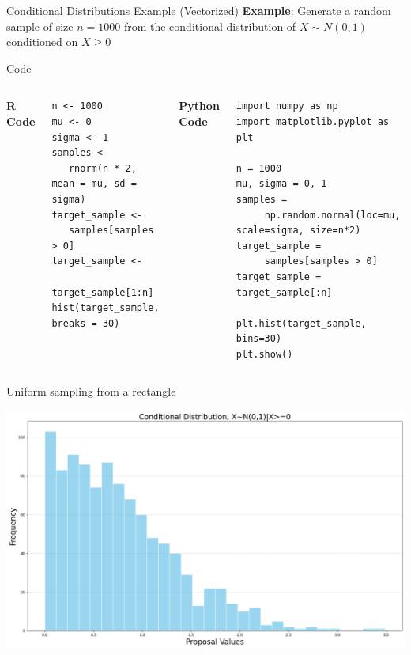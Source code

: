 \documentclass[8pt]{beamer}
\begin{document}
\begin{frame}[fragile]{Conditional Distributions Example (Vectorized)}
\textbf{Example}: Generate a random sample of size $n=1000$ from the conditional distribution of $X \sim N(0,1) $ conditioned on $X\geq 0$

\vspace{2mm}

\alert{Code}
\begin{columns}
\textbf{R Code}

\begin{lstlisting}
n <- 1000
mu <- 0
sigma <- 1
samples <- 
   rnorm(n * 2, mean = mu, sd = sigma)
target_sample <-
   samples[samples > 0]
target_sample <- 
   target_sample[1:n]
hist(target_sample, breaks = 30)
\end{lstlisting}

\textbf{Python Code}

\begin{lstlisting}
import numpy as np
import matplotlib.pyplot as plt

n = 1000
mu, sigma = 0, 1
samples =
     np.random.normal(loc=mu, scale=sigma, size=n*2) 
target_sample = 
     samples[samples > 0]                        
target_sample = target_sample[:n]                         

plt.hist(target_sample, bins=30)
plt.show()
\end{lstlisting}

\end{columns}
\end{frame}


\begin{frame}{Uniform sampling from a rectangle}
\begin{center}
\includegraphics[width=\textwidth]{chapter1-part4-plot1.png}
\end{center}
\end{frame}
\end{document}
